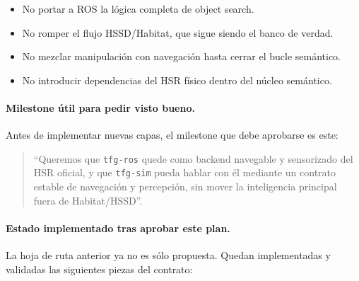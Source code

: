 \documentclass[11pt,a4paper]{article}
\begin{document}
\begin{itemize}
  \item No portar a ROS la lógica completa de object search.
  \item No romper el flujo HSSD/Habitat, que sigue siendo el banco de verdad.
  \item No mezclar manipulación con navegación hasta cerrar el bucle semántico.
  \item No introducir dependencias del HSR físico dentro del núcleo semántico.
\end{itemize}

\paragraph{Milestone útil para pedir visto bueno.}

Antes de implementar nuevas capas, el milestone que debe aprobarse es este:

\begin{quote}
``Queremos que \texttt{tfg-ros} quede como backend navegable y sensorizado del
HSR oficial, y que \texttt{tfg-sim} pueda hablar con él mediante un contrato
estable de navegación y percepción, sin mover la inteligencia principal fuera
de Habitat/HSSD''.
\end{quote}

\paragraph{Estado implementado tras aprobar este plan.}

La hoja de ruta anterior ya no es sólo propuesta. Quedan implementadas y
validadas las siguientes piezas del contrato:
\end{document}

